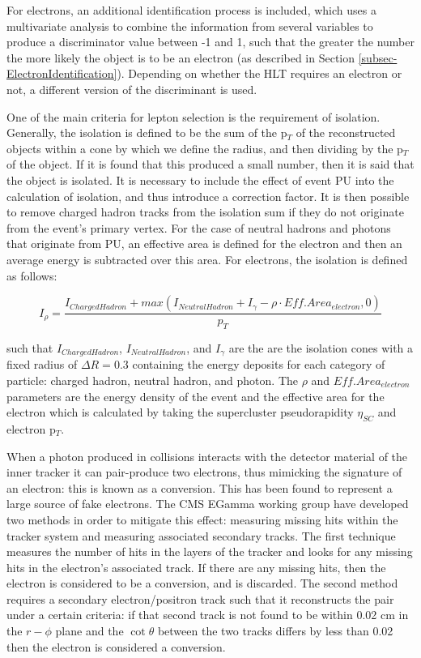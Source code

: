 For electrons, an additional identification process is included, which uses a multivariate analysis to combine the information from several variables to produce a discriminator value between -1 and 1, such that the greater the number the more likely the object is to be an electron (as described in Section \ref{subsec-ElectronIdentification}). Depending on whether the HLT requires an electron or not, a different version of the discriminant is used. 

One of the main criteria for lepton selection is the requirement of isolation. Generally, the isolation is defined to be the sum of the p$_T$ of the reconstructed objects within a cone by which we define the radius, and then dividing by the p$_T$ of the object. If it is found that this produced a small number, then it is said that the object is isolated. It is necessary to include the effect of event PU into the calculation of isolation, and thus introduce a correction factor. It is then possible to remove charged hadron tracks from the isolation sum if they do not originate from the event's primary vertex. For the case of neutral hadrons and photons that originate from PU, an effective area is defined for the electron and then an average energy is subtracted over this area. For electrons, the isolation is defined as follows:

\begin{equation} \label{eq-RelativeIsolation}
I_{\rho} = \frac{I_{ChargedHadron}+max\left(I_{NeutralHadron} + I_{\gamma} - \rho \cdot Eff.Area_{electron}, 0 \right)}{p_T}
\end{equation}

such that $I_{ChargedHadron}$, $I_{NeutralHadron}$, and $I_{\gamma}$ are the are the isolation cones with a fixed radius of $\Delta R = 0.3$ containing the energy deposits for each category of particle: charged hadron, neutral hadron, and photon. The $\rho$ and $Eff.Area_{electron}$ parameters are the energy density of the event and the effective area for the electron which is calculated by taking the supercluster pseudorapidity $\eta_{SC}$ and electron p$_T$. 

When a photon produced in collisions interacts with the detector material of the inner tracker it can pair-produce two electrons, thus mimicking the signature of an electron: this is known as a conversion. This has been found to represent a large source of fake electrons. The CMS EGamma working group have developed two methods in order to mitigate this effect: measuring missing hits within the tracker system and measuring associated secondary tracks. The first technique measures the number of hits in the layers of the tracker and looks for any missing hits in the electron's associated track. If there are any missing hits, then the electron is considered to be a conversion, and is discarded. The second method requires a secondary electron/positron track such that it reconstructs the pair under a certain criteria: if that second track is not found to be within 0.02 cm in the $r - \phi$ plane and the $\cot\theta$ between the two tracks differs by less than 0.02 then the electron is considered a conversion. 


